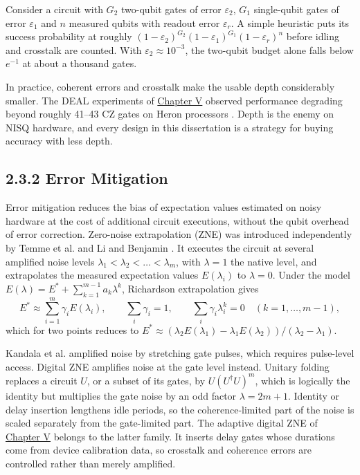 \documentclass{report}
\theoremstyle{plain}
\theoremstyle{definition}
\theoremstyle{remark}
\newcommand{\eps}{\varepsilon}
\begin{document}
Consider a circuit with $G_2$ two-qubit gates of error $\eps_2$, $G_1$ single-qubit gates of error $\eps_1$ and $n$ measured qubits with readout error $\eps_r$. A simple heuristic puts its success probability at roughly $(1-\eps_2)^{G_2}(1-\eps_1)^{G_1}(1-\eps_r)^{n}$ before idling and crosstalk are counted. With $\eps_2\approx10^{-3}$, the two-qubit budget alone falls below $e^{-1}$ at about a thousand gates.

In practice, coherent errors and crosstalk make the usable depth considerably smaller. The DEAL experiments of \hyperref[ch:nisq]{Chapter V} observed performance degrading beyond roughly 41--43 CZ gates on Heron processors \cite{guo2025deal}. Depth is the enemy on NISQ hardware, and every design in this dissertation is a strategy for buying accuracy with less depth.

\subsection{2.3.2 Error Mitigation}

Error mitigation reduces the bias of expectation values estimated on noisy hardware at the cost of additional circuit executions, without the qubit overhead of error correction. Zero-noise extrapolation (ZNE) was introduced independently by Temme et al. \cite{temme2017errormitigation} and Li and Benjamin \cite{li2017activeerror}. It executes the circuit at several amplified noise levels $\lambda_1<\lambda_2<\dots<\lambda_m$, with $\lambda=1$ the native level, and extrapolates the measured expectation values $E(\lambda_i)$ to $\lambda=0$. Under the model $E(\lambda)=E^{\ast}+\sum_{k=1}^{m-1}a_k\lambda^k$, Richardson extrapolation gives
\hypertarget{eq:bg:zne}{}\[
E^{\ast}\approx\sum_{i=1}^{m}\gamma_iE(\lambda_i),\qquad \sum_{i}\gamma_i=1,\qquad \sum_{i}\gamma_i\lambda_i^{k}=0\quad(k=1,\dots,m-1),
\tag{2.5}\]
which for two points reduces to $E^{\ast}\approx(\lambda_2E(\lambda_1)-\lambda_1E(\lambda_2))/(\lambda_2-\lambda_1)$.

Kandala et al. \cite{kandala2019errormitigation} amplified noise by stretching gate pulses, which requires pulse-level access. Digital ZNE \cite{giurgicatiron2020digitalzne} amplifies noise at the gate level instead. Unitary folding replaces a circuit $U$, or a subset of its gates, by $U(U^{\dagger}U)^{m}$, which is logically the identity but multiplies the gate noise by an odd factor $\lambda=2m+1$. Identity or delay insertion lengthens idle periods, so the coherence-limited part of the noise is scaled separately from the gate-limited part. The adaptive digital ZNE of \hyperref[ch:nisq]{Chapter V} \cite{guo2025deal} belongs to the latter family. It inserts delay gates whose durations come from device calibration data, so crosstalk and coherence errors are controlled rather than merely amplified.
\end{document}
